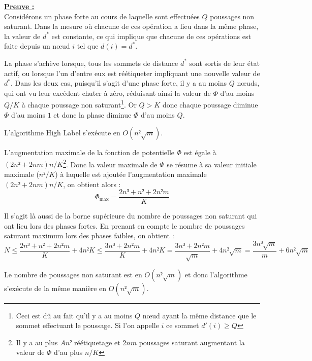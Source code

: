 \underline{\textbf{Preuve :}}\\
Considérons un phase forte au cours de laquelle sont effectuées $Q$ poussages non saturant.
Dans la mesure où chacune de ces opération a lieu dans la même phase, la valeur de $d^*$ est
constante, ce qui implique que chacune de ces opérations est faite depuis un n\oe ud $i$ tel que
$d(i) = d^*$.

La phase s'achève lorsque, tous les sommets de distance $d^*$ sont sortis de leur état actif, ou
lorsque l'un d'entre eux est réétiqueter impliquant une nouvelle valeur de $d^*$. Dans les deux cas,
puisqu'il s'agit d'une phase forte, il y a au moins $Q$ n\oe uds, qui ont vu leur excédent chuter à
zéro, réduisant ainsi la valeur de $\Phi$ d'au moins $Q/K$ à chaque poussage non
saturant\footnote{Ceci est dû au fait qu'il y a au moins $Q$ n\oe ud ayant la même distance que le
sommet effectuant le poussage. Si l'on appelle $i$ ce sommet $d'(i) \geq Q$}. Or $Q>K$
donc chaque poussage diminue $\Phi$ d'au moins $1$ et donc la phase diminue $\Phi$ d'au moins $Q$.

\begin{thrm}
	L'algorithme High Label s'exécute en $O(n²\sqrt{m})$.
\end{thrm}

L'augmentation maximale de la fonction de potentielle $\Phi$ est égale à $(2n²+2nm)n/K$\footnote{Il
	y a au plus $An²$ réétiquetage et $2nm$ poussages saturant augmentant la valeur de $\Phi$ d'au
plus $n/K$}. Donc la valeur maximale de $\Phi$ se résume à sa valeur initiale maximale ($n²/K$) à
laquelle est ajoutée l'augmentation maximale $(2n²+2nm)n/K$, on obtient alors : $$
\Phi_{\max} = \frac{2n³ + n² + 2n²m}{K} $$

Il s'agit là aussi de la borne supérieure du nombre de poussages non saturant qui ont lieu lors des
phases fortes. En prenant en compte le nombre de poussages saturant maximum lors des phases faibles,
on obtient : $$
N \leq \frac{2n³ + n² + 2n²m}{K} + 4n²K \leq \frac{3n³ + 2n²m}{K} + 4n²K = \frac{3n³ +
2n²m}{\sqrt{m}} + 4n²\sqrt{m} = \frac{3n³\sqrt{m}}{m} + 6n²\sqrt{m} $$

Le nombre de poussages non saturant est en $O(n²\sqrt{m})$ et donc l'algorithme s'exécute de la même
manière en $O(n²\sqrt{m})$.

